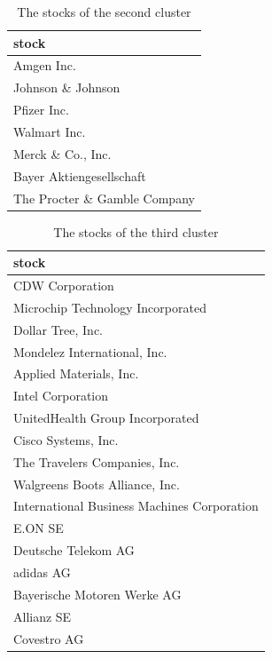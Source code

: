 \documentclass[11pt,a4paper,]{article}
\begin{document}
\begin{table}

\caption{\label{tab:memb-two}The stocks of the second cluster}
\centering
\begin{tabular}[t]{l}
\hline
stock\\
\hline
Amgen Inc.\\
\hline
Johnson \& Johnson\\
\hline
Pfizer Inc.\\
\hline
Walmart Inc.\\
\hline
Merck \& Co., Inc.\\
\hline
Bayer Aktiengesellschaft\\
\hline
The Procter \& Gamble Company\\
\hline
\end{tabular}
\end{table}

\begin{table}

\caption{\label{tab:memb-three}The stocks of the third cluster}
\centering
\begin{tabular}[t]{l}
\hline
stock\\
\hline
CDW Corporation\\
\hline
Microchip Technology Incorporated\\
\hline
Dollar Tree, Inc.\\
\hline
Mondelez International, Inc.\\
\hline
Applied Materials, Inc.\\
\hline
Intel Corporation\\
\hline
UnitedHealth Group Incorporated\\
\hline
Cisco Systems, Inc.\\
\hline
The Travelers Companies, Inc.\\
\hline
Walgreens Boots Alliance, Inc.\\
\hline
International Business Machines Corporation\\
\hline
E.ON SE\\
\hline
Deutsche Telekom AG\\
\hline
adidas AG\\
\hline
Bayerische Motoren Werke AG\\
\hline
Allianz SE\\
\hline
Covestro AG\\
\hline
\end{tabular}
\end{table}

\clearpage
\end{document}
